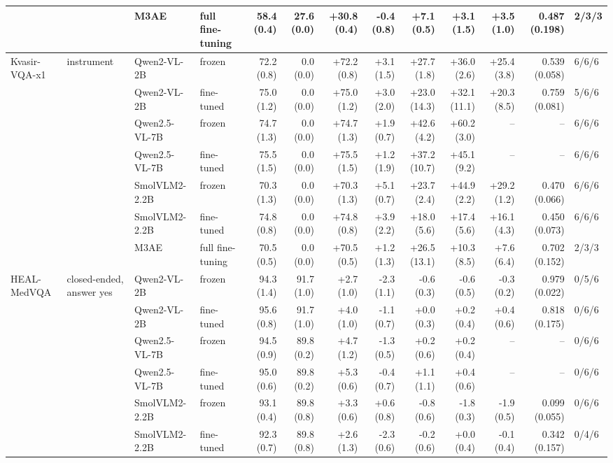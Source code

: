 \begin{table}[t]
\begin{tabular}{llllrrrrrrrrl}
 &  & M3AE & full fine-tuning & 58.4 (0.4) & 27.6 (0.0) & +30.8 (0.4) & -0.4 (0.8) & +7.1 (0.5) & +3.1 (1.5) & +3.5 (1.0) & 0.487 (0.198) & 2/3/3 \\
\midrule
Kvasir-VQA-x1 & instrument & Qwen2-VL-2B & frozen & 72.2 (0.8) & 0.0 (0.0) & +72.2 (0.8) & +3.1 (1.5) & +27.7 (1.8) & +36.0 (2.6) & +25.4 (3.8) & 0.539 (0.058) & 6/6/6 \\
 &  & Qwen2-VL-2B & fine-tuned & 75.0 (1.2) & 0.0 (0.0) & +75.0 (1.2) & +3.0 (2.0) & +23.0 (14.3) & +32.1 (11.1) & +20.3 (8.5) & 0.759 (0.081) & 5/6/6 \\
 &  & Qwen2.5-VL-7B & frozen & 74.7 (1.3) & 0.0 (0.0) & +74.7 (1.3) & +1.9 (0.7) & +42.6 (4.2) & +60.2 (3.0) & -- & -- & 6/6/6 \\
 &  & Qwen2.5-VL-7B & fine-tuned & 75.5 (1.5) & 0.0 (0.0) & +75.5 (1.5) & +1.2 (1.9) & +37.2 (10.7) & +45.1 (9.2) & -- & -- & 6/6/6 \\
 &  & SmolVLM2-2.2B & frozen & 70.3 (1.3) & 0.0 (0.0) & +70.3 (1.3) & +5.1 (0.7) & +23.7 (2.4) & +44.9 (2.2) & +29.2 (1.2) & 0.470 (0.066) & 6/6/6 \\
 &  & SmolVLM2-2.2B & fine-tuned & 74.8 (0.8) & 0.0 (0.0) & +74.8 (0.8) & +3.9 (2.2) & +18.0 (5.6) & +17.4 (5.6) & +16.1 (4.3) & 0.450 (0.073) & 6/6/6 \\
 &  & M3AE & full fine-tuning & 70.5 (0.5) & 0.0 (0.0) & +70.5 (0.5) & +1.2 (1.3) & +26.5 (13.1) & +10.3 (8.5) & +7.6 (6.4) & 0.702 (0.152) & 2/3/3 \\
\midrule
HEAL-MedVQA & closed-ended, answer yes & Qwen2-VL-2B & frozen & 94.3 (1.4) & 91.7 (1.0) & +2.7 (1.0) & -2.3 (1.1) & -0.6 (0.3) & -0.6 (0.5) & -0.3 (0.2) & 0.979 (0.022) & 0/5/6 \\
 &  & Qwen2-VL-2B & fine-tuned & 95.6 (0.8) & 91.7 (1.0) & +4.0 (1.0) & -1.1 (0.7) & +0.0 (0.3) & +0.2 (0.4) & +0.4 (0.6) & 0.818 (0.175) & 0/6/6 \\
 &  & Qwen2.5-VL-7B & frozen & 94.5 (0.9) & 89.8 (0.2) & +4.7 (1.2) & -1.3 (0.5) & +0.2 (0.6) & +0.2 (0.4) & -- & -- & 0/6/6 \\
 &  & Qwen2.5-VL-7B & fine-tuned & 95.0 (0.6) & 89.8 (0.2) & +5.3 (0.6) & -0.4 (0.7) & +1.1 (1.1) & +0.4 (0.6) & -- & -- & 0/6/6 \\
 &  & SmolVLM2-2.2B & frozen & 93.1 (0.4) & 89.8 (0.8) & +3.3 (0.6) & +0.6 (0.8) & -0.8 (0.6) & -1.8 (0.3) & -1.9 (0.5) & 0.099 (0.055) & 0/6/6 \\
 &  & SmolVLM2-2.2B & fine-tuned & 92.3 (0.7) & 89.8 (0.8) & +2.6 (1.3) & -2.3 (0.6) & -0.2 (0.6) & +0.0 (0.4) & -0.1 (0.4) & 0.342 (0.157) & 0/4/6 \\

\end{tabular}
\end{table}
